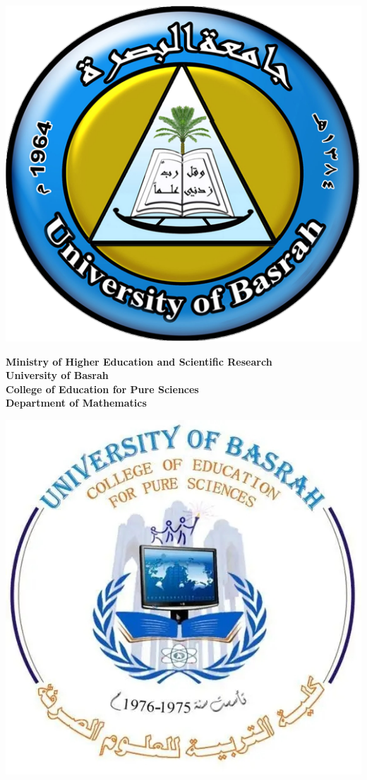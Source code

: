 \begin{titlepage}
	\begin{minipage}{0.2\textwidth}
		\raggedleft\includegraphics[scale=0.2]{Pictures/20231126094730!جامعة_البصرة.png}
	\end{minipage}
	\hfill
	\begin{minipage}{0.5\textwidth}
		\centering
		\textbf{Ministry of Higher Education and Scientific Research}\\
		\textbf{ University of Basrah}\\
		\textbf{College of Education for Pure Sciences}\\
		\textbf{Department of Mathematics}
	\end{minipage}
	\hfill
	\begin{minipage}{0.2\textwidth}
		\raggedright\includegraphics[scale=0.2]{Pictures/FB_IMG_17029184953253241.jpg}  

\end{minipage}
\end{titlepage}
